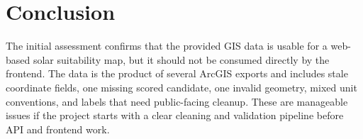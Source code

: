 \documentclass[11pt]{article}
\begin{document}
\section{Conclusion}

The initial assessment confirms that the provided GIS data is usable for a web-based
solar suitability map, but it should not be consumed directly by the frontend. The
data is the product of several ArcGIS exports and includes stale coordinate fields,
one missing scored candidate, one invalid geometry, mixed unit conventions, and
labels that need public-facing cleanup. These are manageable issues if the project
starts with a clear cleaning and validation pipeline before API and frontend work.
\end{document}
